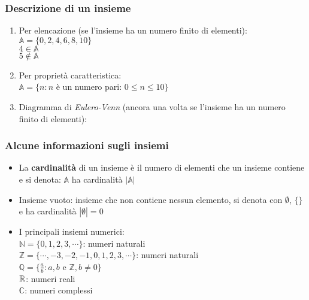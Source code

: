 \documentclass{article}
\begin{document}
\subsubsection*{Descrizione di un insieme}
\begin{enumerate}
	\item Per elencazione (se l'insieme ha un numero finito di elementi):\\
	      $\mathbb{A}=\{0,2,4,6,8,10\}$\\
	      $4\in\mathbb{A}$\\
	      $5\notin\mathbb{A}$
	\item Per proprietà caratteristica:\\
	      $\mathbb{A}=\{n:n$ è un numero pari: $0\le n\le10\}$
	\item Diagramma di \textit{Eulero-Venn} (ancora una volta se l'insieme ha un numero finito di elementi):
\end{enumerate}
\subsubsection*{Alcune informazioni sugli insiemi}
\begin{itemize}
	\item La \textbf{cardinalità} di un insieme è il numero di elementi che un insieme contiene e si denota: $\mathbb{A}$ ha cardinalità $|\mathbb{A}|$
	\item Insieme vuoto: insieme che non contiene nessun elemento, si denota con $\emptyset$, $\{\}$ e ha cardinalità $|\emptyset|=0$
	\item I principali insiemi numerici:\\
	      $\mathbb{N}=\{0,1,2,3,\cdots\}$: numeri naturali\\
	      $\mathbb{Z}=\{\cdots,-3,-2,-1,0,1,2,3,\cdots\}$: numeri naturali\\
	      $\mathbb{Q}=\{\frac{a}{b}:a,b$ e $\mathbb{Z},b\not=0\}$\\
	      $\mathbb{R}$: numeri reali\\
	      $\mathbb{C}$: numeri complessi
\end{itemize}
\end{document}
